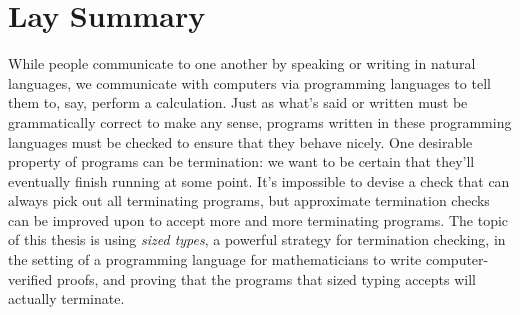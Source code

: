 \chapter{Lay Summary}

While people communicate to one another by speaking or writing in natural languages,
we communicate with computers via programming languages to tell them to, say, perform a calculation.
Just as what's said or written must be grammatically correct to make any sense,
programs written in these programming languages must be checked to ensure that they behave nicely.
One desirable property of programs can be termination:
we want to be certain that they'll eventually finish running at some point.
It's impossible to devise a check that can always pick out all terminating programs,
but approximate termination checks can be improved upon to accept more and more terminating programs.
The topic of this thesis is using \emph{sized types}, a powerful strategy for termination checking,
in the setting of a programming language for mathematicians to write computer-verified proofs,
and proving that the programs that sized typing accepts will actually terminate.